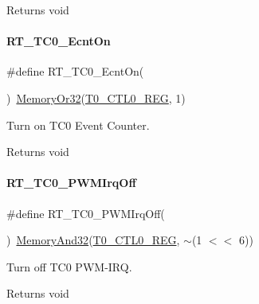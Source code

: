 \begin{DoxyReturn}{Returns}
void 
\end{DoxyReturn}
\mbox{\label{a00041_a4dd8c922ad55805d587d5a73b78d911a}} 
\paragraph{\texorpdfstring{R\+T\+\_\+\+T\+C0\+\_\+\+Ecnt\+On}{RT\_TC0\_EcntOn}}
{\footnotesize\ttfamily \#define R\+T\+\_\+\+T\+C0\+\_\+\+Ecnt\+On(\begin{DoxyParamCaption}{ }\end{DoxyParamCaption})~\mbox{\hyperlink{a00020_a27874a97deab7cecdde5ddecf466e31e}{Memory\+Or32}}(\mbox{\hyperlink{a00020_adadaa0ab1ebbd7ba9b70dfd24c3ed44da869abf9d87f78f45a0e07ad352abb39e}{T0\+\_\+\+C\+T\+L0\+\_\+\+R\+EG}}, 1)}



Turn on T\+C0 Event Counter. 

\begin{DoxyReturn}{Returns}
void 
\end{DoxyReturn}
\mbox{\label{a00041_aa62df019b0279e8510e465f5e920f555}} 
\paragraph{\texorpdfstring{R\+T\+\_\+\+T\+C0\+\_\+\+P\+W\+M\+Irq\+Off}{RT\_TC0\_PWMIrqOff}}
{\footnotesize\ttfamily \#define R\+T\+\_\+\+T\+C0\+\_\+\+P\+W\+M\+Irq\+Off(\begin{DoxyParamCaption}{ }\end{DoxyParamCaption})~\mbox{\hyperlink{a00020_ad87cedffcaadc51db22594fce55173d4}{Memory\+And32}}(\mbox{\hyperlink{a00020_adadaa0ab1ebbd7ba9b70dfd24c3ed44da869abf9d87f78f45a0e07ad352abb39e}{T0\+\_\+\+C\+T\+L0\+\_\+\+R\+EG}}, $\sim$(1 $<$$<$ 6))}



Turn off T\+C0 P\+W\+M-\/\+I\+RQ. 

\begin{DoxyReturn}{Returns}
void 
\end{DoxyReturn}
\mbox{\label{a00041_a76c2b1a397b2035b2f2f2e64940b790f}} 
